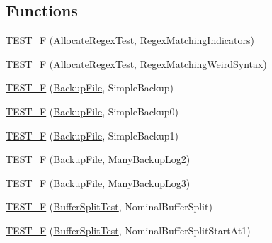 \subsection*{Functions}
\begin{DoxyCompactItemize}
\item 
\hyperlink{namespaceclang_1_1tidy_1_1pagesjaunes_1_1test_af7271fc9b6addd32cbf165dc1d586bcc}{T\+E\+S\+T\+\_\+F} (\hyperlink{classclang_1_1tidy_1_1pagesjaunes_1_1test_1_1_allocate_regex_test}{Allocate\+Regex\+Test}, Regex\+Matching\+Indicators)
\item 
\hyperlink{namespaceclang_1_1tidy_1_1pagesjaunes_1_1test_a4940df4810156915d9d7f59f88f92ec7}{T\+E\+S\+T\+\_\+F} (\hyperlink{classclang_1_1tidy_1_1pagesjaunes_1_1test_1_1_allocate_regex_test}{Allocate\+Regex\+Test}, Regex\+Matching\+Weird\+Syntax)
\item 
\hyperlink{namespaceclang_1_1tidy_1_1pagesjaunes_1_1test_ac6667fa9525cf83fa96849105b98ac8e}{T\+E\+S\+T\+\_\+F} (\hyperlink{classclang_1_1tidy_1_1pagesjaunes_1_1test_1_1_backup_file}{Backup\+File}, Simple\+Backup)
\item 
\hyperlink{namespaceclang_1_1tidy_1_1pagesjaunes_1_1test_a5209433fceb796c949c6b3ce4a1ac56a}{T\+E\+S\+T\+\_\+F} (\hyperlink{classclang_1_1tidy_1_1pagesjaunes_1_1test_1_1_backup_file}{Backup\+File}, Simple\+Backup0)
\item 
\hyperlink{namespaceclang_1_1tidy_1_1pagesjaunes_1_1test_af47e8983ad0de8365930dbc09f15f6d0}{T\+E\+S\+T\+\_\+F} (\hyperlink{classclang_1_1tidy_1_1pagesjaunes_1_1test_1_1_backup_file}{Backup\+File}, Simple\+Backup1)
\item 
\hyperlink{namespaceclang_1_1tidy_1_1pagesjaunes_1_1test_a99b625197cc47c5c30f4509a335dd64c}{T\+E\+S\+T\+\_\+F} (\hyperlink{classclang_1_1tidy_1_1pagesjaunes_1_1test_1_1_backup_file}{Backup\+File}, Many\+Backup\+Log2)
\item 
\hyperlink{namespaceclang_1_1tidy_1_1pagesjaunes_1_1test_acbdee46e3e175a0551d9ce34f3fdf1db}{T\+E\+S\+T\+\_\+F} (\hyperlink{classclang_1_1tidy_1_1pagesjaunes_1_1test_1_1_backup_file}{Backup\+File}, Many\+Backup\+Log3)
\item 
\hyperlink{namespaceclang_1_1tidy_1_1pagesjaunes_1_1test_ae0602bb639990d9c0c7f823d5d187fc3}{T\+E\+S\+T\+\_\+F} (\hyperlink{classclang_1_1tidy_1_1pagesjaunes_1_1test_1_1_buffer_split_test}{Buffer\+Split\+Test}, Nominal\+Buffer\+Split)
\item 
\hyperlink{namespaceclang_1_1tidy_1_1pagesjaunes_1_1test_a9754e282dd6f8e30e4a45e90cac8e610}{T\+E\+S\+T\+\_\+F} (\hyperlink{classclang_1_1tidy_1_1pagesjaunes_1_1test_1_1_buffer_split_test}{Buffer\+Split\+Test}, Nominal\+Buffer\+Split\+Start\+At1)

\end{DoxyCompactItemize}
